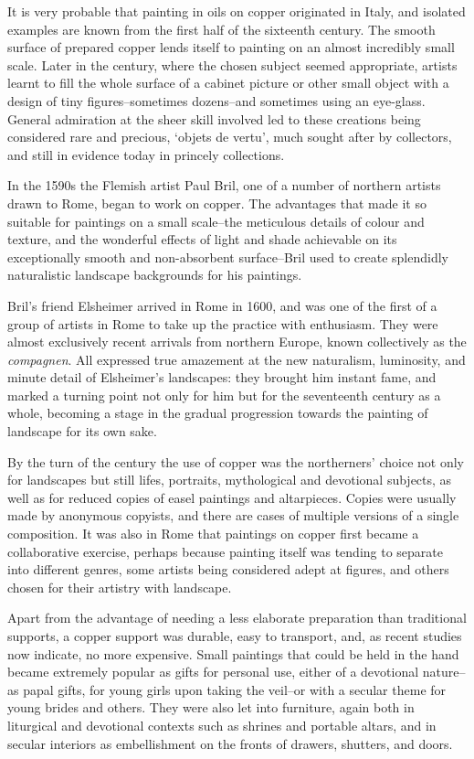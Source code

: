 \documentclass[a4paper,12pt]{article}
\begin{document}
It is very probable that painting in oils on copper originated in
Italy, and isolated examples are known from the first half of the
sixteenth century.  The smooth surface of prepared copper lends itself
to painting on an almost incredibly small scale.  Later in the
century, where the chosen subject seemed appropriate, artists learnt
to fill the whole surface of a cabinet picture or other small object
with a design of tiny figures--sometimes dozens--and sometimes using
an eye-glass.  General admiration at the sheer skill involved led to
these creations being considered rare and precious, `objets de vertu',
much sought after by collectors, and still in evidence today in princely
collections.

In the 1590s the Flemish artist Paul Bril, one of a number of northern
artists drawn to Rome, began to work on copper.  The advantages that
made it so suitable for paintings on a small scale--the meticulous
details of colour and texture, and the wonderful effects of light and
shade achievable on its exceptionally smooth and non-absorbent
surface--Bril used to create splendidly naturalistic landscape
backgrounds for his paintings.

Bril's friend Elsheimer arrived in Rome in 1600, and was one of the
first of a group of artists in Rome to take up the practice with
enthusiasm. They were almost exclusively recent arrivals from northern
Europe, known collectively as the \textit{compagnen}.  All expressed
true amazement at the new naturalism, luminosity, and minute detail of
Elsheimer's landscapes: they brought him instant fame, and marked a
turning point not only for him but for the seventeenth century as a
whole, becoming a stage in the gradual progression towards the
painting of landscape for its own sake.

By the turn of the century the use of copper was the northerners'
choice not only for landscapes but still lifes, portraits,
mythological and devotional subjects, as well as for reduced copies of
easel paintings and altarpieces.  Copies were usually made by
anonymous copyists, and there are cases of multiple versions of a
single composition.  It was also in Rome that paintings on copper
first became a collaborative exercise, perhaps because painting itself
was tending to separate into different genres, some artists being
considered adept at figures, and others chosen for their artistry with
landscape.

Apart from the advantage of needing a less elaborate preparation than
traditional supports, a copper support was durable, easy to transport,
and, as recent studies now indicate, no more expensive.  Small
paintings that could be held in the hand became extremely popular as
gifts for personal use, either of a devotional nature--as papal gifts,
for young girls upon taking the veil--or with a secular theme for
young brides and others.  They were also let into furniture, again
both in liturgical and devotional contexts such as shrines and
portable altars, and in secular interiors as embellishment on the
fronts of drawers, shutters, and doors.
\end{document}
